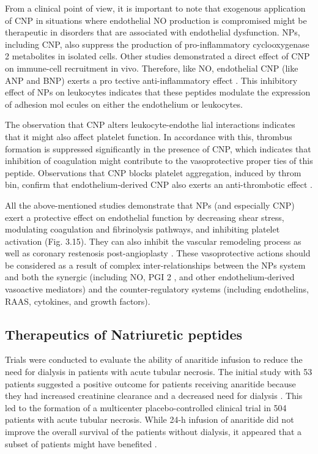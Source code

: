 \documentclass[14pt,a4paper,onecolumn]{extarticle}
\begin{document}
From a clinical point of view, it is important to note that exogenous application of CNP in situations where endothelial NO production is compromised might be therapeutic in disorders that are associated with endothelial dysfunction. NPs, including CNP, also suppress the production of pro-inflammatory cyclooxygenase 2 metabolites in isolated cells. Other studies demonstrated a direct effect of CNP on immune-cell recruitment in vivo. Therefore, like NO, endothelial CNP (like ANP and BNP) exerts a pro tective anti-inflammatory effect \citep{283}. This inhibitory effect of NPs on leukocytes indicates that these peptides modulate the expression of adhesion mol ecules on either the endothelium or leukocytes.



The observation that CNP alters leukocyte-endothe lial interactions indicates that it might also affect platelet function. In accordance with this, thrombus formation is suppressed significantly in the presence of CNP, which indicates that inhibition of coagulation might contribute to the vasoprotective proper ties of this peptide. Observations that CNP blocks platelet aggregation, induced by throm bin, confirm that endothelium-derived CNP also exerts an anti-thrombotic effect \citep{267}.



All the above-mentioned studies demonstrate that NPs (and especially CNP) exert a protective effect on endothelial function by decreasing shear stress, modulating coagulation and fibrinolysis pathways, and inhibiting platelet activation (Fig. 3.15). They can also inhibit the vascular remodeling process as well as coronary restenosis post-angioplasty \citep{89} \citep{267} \citep{283}. These vasoprotective actions should be considered as a result of complex inter-relationships between the NPs system and both the synergic (including NO, PGI 2 , and other endothelium-derived vasoactive mediators) and the counter-regulatory systems (including endothelins, RAAS, cytokines, and growth factors).



\subsection{Therapeutics of Natriuretic peptides}



Trials were conducted to evaluate the ability of anaritide infusion to reduce the need for dialysis in patients with acute tubular necrosis. The initial study with 53 patients suggested a positive outcome for patients receiving anaritide because they had increased creatinine clearance and a decreased need for dialysis \citep{Rahman1994}. This led to the formation of a multicenter placebo-controlled clinical trial in 504 patients with acute tubular necrosis. While 24-h infusion of anaritide did not improve the overall survival of the patients without dialysis, it appeared that a subset of patients might have benefited \citep{Allgren1997}.
\end{document}
